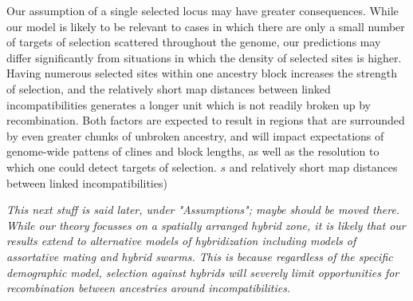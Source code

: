 \documentclass[11pt,letterpaper]{article}
\newcommand{\alisa}[1]{{\em \color{red} #1}}
\newcommand{\plr}[1]{{\em \color{blue} #1}}
\newcommand{\yb}[1]{{\em \color{magenta} #1}}
\begin{document}
Our assumption of a single selected locus may have greater consequences. While our model is likely to be relevant to cases in which there are only a small number of targets of selection scattered throughout the genome, our predictions may differ significantly from situations in which the density of selected sites is higher. 
Having numerous selected sites within one ancestry block increases the strength of selection, and the relatively short map distances between linked incompatibilities generates a longer unit which is not readily broken up by recombination. Both factors are expected to result in regions that are surrounded by even greater chunks of unbroken ancestry, and will impact expectations of genome-wide pattens of clines and block lengths, as well as the resolution to which one could detect targets of selection. 
 $s$ and relatively short map distances between linked incompatibilities)






\plr{This next stuff is said later, under "Assumptions"; maybe should be moved there.}
\yb{While our theory focusses on a spatially arranged hybrid zone, it is likely that our results extend to alternative models of hybridization including models of assortative mating and hybrid swarms. This is because regardless of the specific demographic model, selection against hybrids will severely limit opportunities for recombination between ancestries around incompatibilities.}
\end{document}
